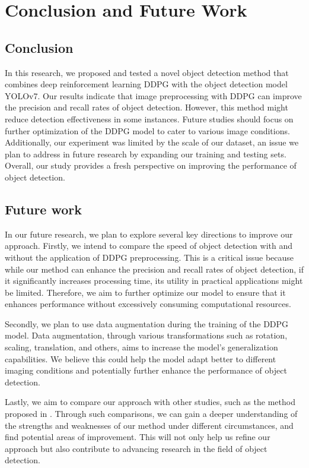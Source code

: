 \documentclass{PHlab-thesis}
\begin{document}
\chapter{Conclusion and Future Work}
\section{Conclusion}
In this research, we proposed and tested a novel object detection method that combines deep reinforcement learning DDPG with the object detection model YOLOv7. Our results indicate that image preprocessing with DDPG can improve the precision and recall rates of object detection. However, this method might reduce detection effectiveness in some instances. Future studies should focus on further optimization of the DDPG model to cater to various image conditions. Additionally, our experiment was limited by the scale of our dataset, an issue we plan to address in future research by expanding our training and testing sets. Overall, our study provides a fresh perspective on improving the performance of object detection.

\section{Future work}
In our future research, we plan to explore several key directions to improve our approach. Firstly, we intend to compare the speed of object detection with and without the application of DDPG preprocessing. This is a critical issue because while our method can enhance the precision and recall rates of object detection, if it significantly increases processing time, its utility in practical applications might be limited. Therefore, we aim to further optimize our model to ensure that it enhances performance without excessively consuming computational resources.

Secondly, we plan to use data augmentation during the training of the DDPG model. Data augmentation, through various transformations such as rotation, scaling, translation, and others, aims to increase the model's generalization capabilities. We believe this could help the model adapt better to different imaging conditions and potentially further enhance the performance of object detection.

Lastly, we aim to compare our approach with other studies, such as the method proposed in \cite{nayak2020reinforcement}. Through such comparisons, we can gain a deeper understanding of the strengths and weaknesses of our method under different circumstances, and find potential areas of improvement. This will not only help us refine our approach but also contribute to advancing research in the field of object detection.

\newpage
{}
\printbibliography
\end{document}
